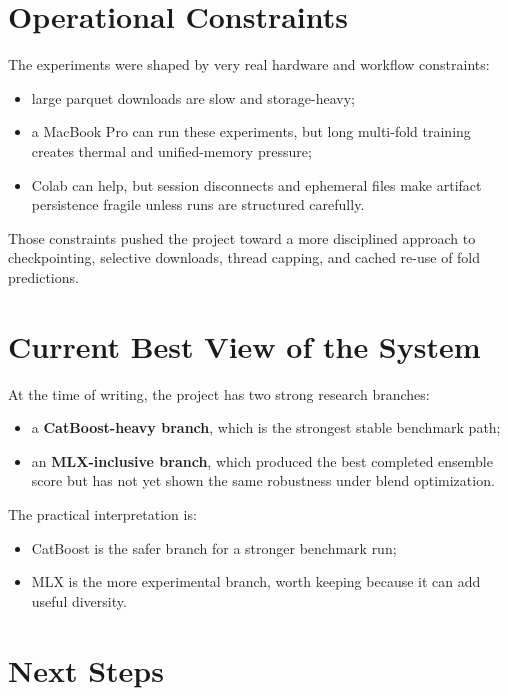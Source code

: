 \documentclass[11pt]{article}
\begin{document}
\section{Operational Constraints}

The experiments were shaped by very real hardware and workflow constraints:

\begin{itemize}[leftmargin=1.5em]
  \item large parquet downloads are slow and storage-heavy;
  \item a MacBook Pro can run these experiments, but long multi-fold training creates thermal and unified-memory pressure;
  \item Colab can help, but session disconnects and ephemeral files make artifact persistence fragile unless runs are structured carefully.
\end{itemize}

Those constraints pushed the project toward a more disciplined approach to checkpointing, selective downloads, thread capping, and cached re-use of fold predictions.

\section{Current Best View of the System}

At the time of writing, the project has two strong research branches:

\begin{itemize}[leftmargin=1.5em]
  \item a \textbf{CatBoost-heavy branch}, which is the strongest stable benchmark path;
  \item an \textbf{MLX-inclusive branch}, which produced the best completed ensemble score but has not yet shown the same robustness under blend optimization.
\end{itemize}

The practical interpretation is:

\begin{itemize}[leftmargin=1.5em]
  \item CatBoost is the safer branch for a stronger benchmark run;
  \item MLX is the more experimental branch, worth keeping because it can add useful diversity.
\end{itemize}

\section{Next Steps}
\end{document}

